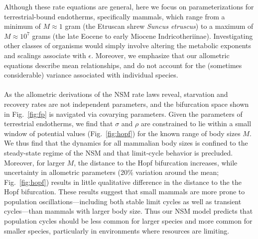 \documentclass{pnastwo}
\begin{document}
\begin{article}
Although these rate equations are general, here we focus on parameterizations
for terrestrial-bound endotherms, specifically mammals, which range from a
minimum of $M\approx1$ gram (the Etruscan shrew \emph{Suncus etruscus}) to a
maximum of $M\approx10^7$ grams (the late Eocene to early Miocene
Indricotheriinae).  Investigating other classes of organisms would simply
involve altering the metabolic exponents and scalings associate with
$\epsilon$. Moreover, we emphasize that our allometric equations describe
mean relationships, and do not account for the (sometimes considerable)
variance associated with individual species.
\\

 \\
As the allometric derivations of the NSM rate laws reveal, starvation and recovery rates are not independent parameters, and the bifurcation space shown in
Fig.~\ref{fig:fp} is navigated via covarying parameters.  Given the
parameters of terrestrial endotherms, we find that $\sigma$ and $\rho$ are
constrained to lie within a small window of potential values
(Fig.~\ref{fig:hopf}) for the known range of body sizes $M$.  We thus find
that the dynamics for all mammalian body sizes is confined to the
steady-state regime of the NSM and that  limit-cycle behavior is precluded.
Moreover, for larger $M$, the distance to the Hopf bifurcation increases,
while uncertainty in allometric parameters (20\% variation around the mean;
Fig.~\ref{fig:hopf}) results in little qualitative difference in the distance
to the the Hopf bifurcation. These results suggest that small mammals are
more prone to population oscillations---including both stable limit cycles as
well as transient cycles---than mammals with larger body size.  Thus our NSM
model predicts that population cycles should be less common for larger
species and more common for smaller species, particularly in environments
where resources are limiting.%


\end{article}
\end{document}
